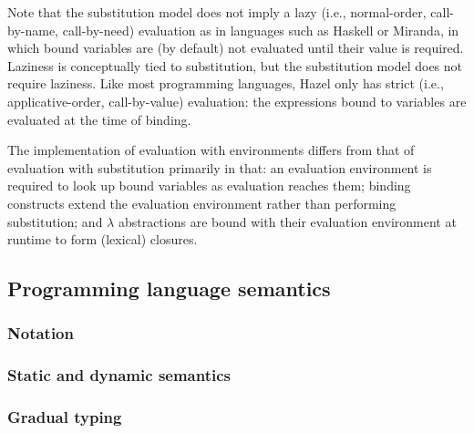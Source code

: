 Note that the substitution model does not imply a lazy (i.e., normal-order, call-by-name, call-by-need) evaluation as in languages such as Haskell or Miranda, in which bound variables are (by default) not evaluated until their value is required. Laziness is conceptually tied to substitution, but the substitution model does not require laziness. Like most programming languages, Hazel only has strict (i.e., applicative-order, call-by-value) evaluation: the expressions bound to variables are evaluated at the time of binding.


The implementation of evaluation with environments differs from that of evaluation with substitution primarily in that: an evaluation environment is required to look up bound variables as evaluation reaches them; binding constructs extend the evaluation environment rather than performing substitution; and $\lambda$ abstractions are bound with their evaluation environment at runtime to form (lexical) closures.

\subsection{Programming language semantics}
\label{sec:type-systems}

\subsubsection{Notation}
\label{sec:semantics-notation}


\subsubsection{Static and dynamic semantics}
\label{sec:static-dynamic-semantics}

\subsubsection{Gradual typing}
\label{sec:gradual}


